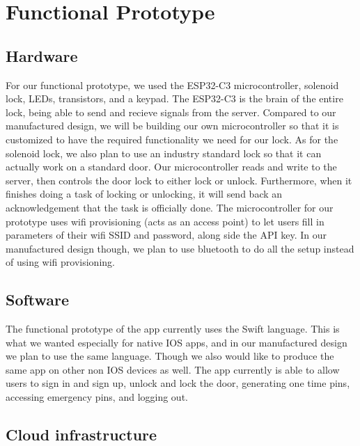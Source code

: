 \newpage %
\section{Functional Prototype}


\subsection{Hardware}

For our functional prototype, we used the ESP32-C3 microcontroller, solenoid lock, LEDs, transistors, and a keypad. The ESP32-C3 is the brain of the entire lock, being able to send and recieve signals from the server. Compared to our manufactured design, we will be building our own microcontroller so that it is customized to have the required functionality we need for our lock. As for the solenoid lock, we also plan to use an industry standard lock so that it can actually work on a standard door. Our microcontroller reads and write to the server, then controls the door lock to either lock or unlock. Furthermore, when it finishes doing a task of locking or unlocking, it will send back an acknowledgement that the task is officially done. The microcontroller for our prototype uses wifi provisioning (acts as an access point) to let users fill in parameters of their wifi SSID and password, along side the API key. In our manufactured design though, we plan to use bluetooth to do all the setup instead of using wifi provisioning.

\subsection{Software}

The functional prototype of the app currently uses the Swift language. This is what we wanted especially for native IOS apps, and in our manufactured design we plan to use the same language. Though we also would like to produce the same app on other non IOS devices as well. The app currently is able to allow users to sign in and sign up, unlock and lock the door, generating one time pins, accessing emergency pins, and logging out. 

\subsection{Cloud infrastructure}

